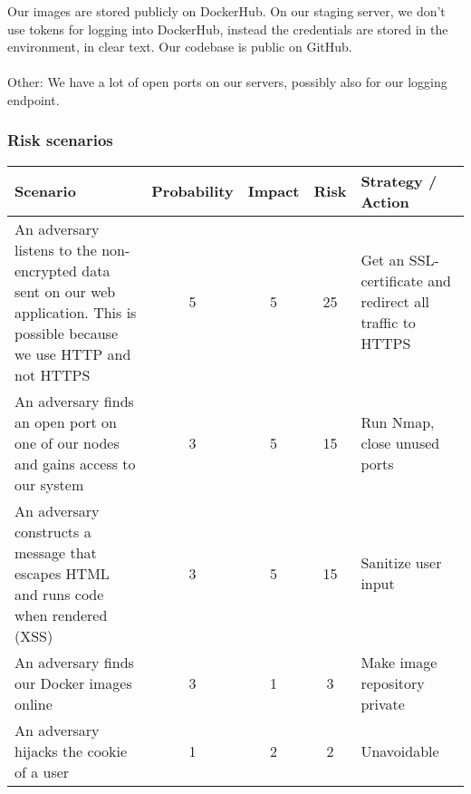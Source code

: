 Our images are stored publicly on DockerHub.
On our staging server, we don’t use tokens for logging into DockerHub, instead the credentials are stored in the environment, in clear text.
Our codebase is public on GitHub.\\\\
Other: We have a lot of open ports on our servers, possibly also for our logging endpoint.

\subsubsection{Risk scenarios}

\begin{center}
\begin{tabular}{ |p{3.5cm}|c|c|c|p{2.5cm}| } 
 \hline
 Scenario & Probability & Impact & Risk & Strategy / Action\\ [0.5ex] 
 \hline
 An adversary listens to the non-encrypted data sent on our web application. This is possible because we use HTTP and not HTTPS
 & 5 & 5 & 25 & Get an SSL-certificate and redirect all traffic to HTTPS\\
\hline
 An adversary finds an open port on one of our nodes and gains access to our system & 3 & 5 & 15 & Run Nmap, close unused ports\\
 \hline 
 An adversary constructs a message that escapes HTML and runs code when rendered (XSS) & 3 & 5 & 15 & Sanitize user input\\
 \hline
  An adversary finds our Docker images online & 3 & 1 & 3 & Make image repository private\\ 
 \hline
 An adversary hijacks the cookie of a user & 1 & 2 & 2 & Unavoidable\\ 
 \hline
\end{tabular}
\end{center}

\\